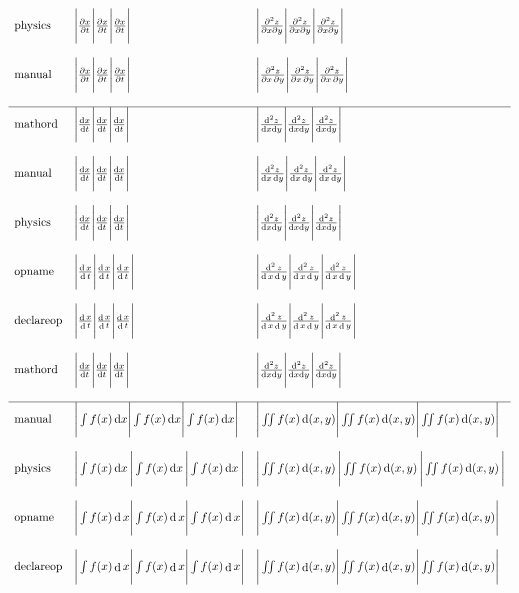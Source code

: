 \documentclass{standalone}
\newcommand{\ddalt}{\mathop{}\!\mathrm{d}}
\newcommand{\ddord}{\mathord{\mathrm{d}}}
\newcommand{\ddop}{\operatorname{d}}
\newcommand{\pp}{\mathop{}\!\partial}
\DeclareMathOperator*{\ddOP}{d}
\def\repeat#1{\Bigg|#1\Bigg|#1\Bigg|#1\Bigg|}
\begin{document}
$\begin{array}{llll}
\text{physics}   & \repeat{\pdv{x}{t}}       & \repeat{\pdv{z}{x}{y}}        \\\\
\text{manual}    & \repeat{\frac{\pp{x}}{\pp{t}}} & \repeat{\frac{\pp^2{z}}{\pp{x}\pp{y}}}  \\\\
\hline
\text{mathord}   & \repeat{\frac{\ddord{x}}{\ddord{t}}} & \repeat{\frac{\ddord^2{z}}{\ddord{x}\ddord{y}}}  \\\\
\text{manual}    & \repeat{\frac{\ddalt{x}}{\ddalt{t}}} & \repeat{\frac{\ddalt^2{z}}{\ddalt{x}\ddalt{y}}}  \\\\
\text{physics}   & \repeat{\frac{\dd{x}}{\dd{t}}}       & \repeat{\frac{\dd^2{z}}{\dd{x}\dd{y}}}        \\\\
\text{opname}    & \repeat{\frac{\ddop{x}}{\ddop{t}}}   & \repeat{\frac{\ddop^2{z}}{\ddop{x}\ddop{y}}}    \\\\
\text{declareop} & \repeat{\frac{\ddOP{x}}{\ddOP{t}}}   & \repeat{\frac{\ddOP^2{z}}{\ddOP{x}\ddOP{y}}}    \\\\
\text{mathord}   & \repeat{\frac{\ddord{x}}{\ddord{t}}} & \repeat{\frac{\ddord^2{z}}{\ddord{x}\ddord{y}}}  \\\\
\hline
\text{manual}    & \repeat{\int f(x)\ddalt{x}} & \repeat{\iint f(x)\ddalt(x,y)} \\\\
\text{physics}   & \repeat{\int f(x)\dd{x}}    & \repeat{\iint f(x)\dd(x,y)} \\\\
\text{opname}    & \repeat{\int f(x)\ddop{x}}  & \repeat{\iint f(x)\ddop(x,y)} \\\\
\text{declareop} & \repeat{\int f(x)\ddOP{x}}  & \repeat{\iint f(x)\ddOP(x,y)} \\\\
\end{array}$
\end{document}
